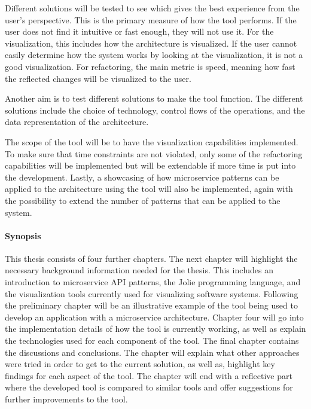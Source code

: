 Different solutions will be tested to see which gives the best experience from the user's perspective. This is the primary measure of how the tool performs. If the user does not find it intuitive or fast enough, they will not use it.
For the visualization, this includes how the architecture is visualized. If the user cannot easily determine how the system works by looking at the visualization, it is not a good visualization.
For refactoring, the main metric is speed, meaning how fast the reflected changes will be visualized to the user.

Another aim is to test different solutions to make the tool function.
The different solutions include the choice of technology, control flows of the operations, and the data representation of the architecture.

The scope of the tool will be to have the visualization capabilities implemented.
To make sure that time constraints are not violated, only some of the refactoring capabilities will be implemented but will be extendable if more time is put into the development.
Lastly, a showcasing of how microservice patterns can be applied to the architecture using the tool will also be implemented, again with the possibility to extend the number of patterns that can be applied to the system.

\paragraph{Synopsis}
This thesis consists of four further chapters. The next chapter will highlight the necessary background information needed for the thesis. This includes an introduction to microservice API patterns, the Jolie programming language, and the visualization tools currently used for visualizing software systems.
Following the preliminary chapter will be an illustrative example of the tool being used to develop an application with a microservice architecture.
Chapter four will go into the implementation details of how the tool is currently working, as well as explain the technologies used for each component of the tool.
The final chapter contains the discussions and conclusions. The chapter will explain what other approaches were tried in order to get to the current solution, as well as, highlight key findings for each aspect of the tool.
The chapter will end with a reflective part where the developed tool is compared to similar tools and offer suggestions for further improvements to the tool.